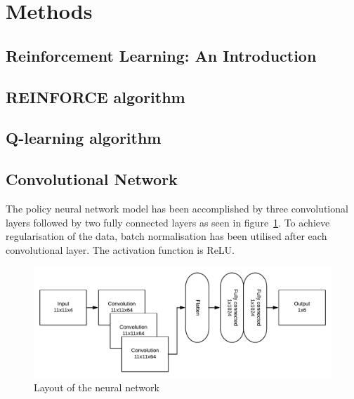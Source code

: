 \section{Methods}
\label{sec:methods}


\subsection{Reinforcement Learning: An Introduction} %


\subsection{REINFORCE algorithm}
\label{sec:reinforce}

\subsection{Q-learning algorithm}

\subsection{Convolutional Network}
\label{sec:conv}
The policy neural network model has been accomplished by three convolutional layers followed by two fully connected layers as seen in figure~\ref{fig:network}. To achieve regularisation of the data, batch normalisation has been utilised after each convolutional layer. The activation function is ReLU.

\begin{figure}[htb]
    \centerline{\includegraphics[width=1.0\linewidth]{docs/article/inputs/conv.pdf}}
    \caption{Layout of the neural network}\label{fig:network}
\end{figure}

